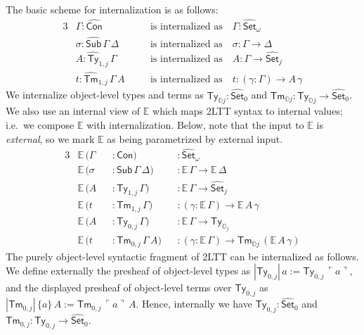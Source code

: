\documentclass[acmsmall]{acmart}
\newcommand{\msf}[1]{\mathsf{#1}}
\newcommand{\mbb}[1]{\mathbb{#1}}
\newcommand{\wh}[1]{\widehat{#1}}
\newcommand{\mbbo}{\mbb{O}}
\newcommand{\Con}{\msf{Con}}
\newcommand{\Sub}{\msf{Sub}}
\newcommand{\Ty}{\msf{Ty}}
\newcommand{\Tm}{\msf{Tm}}
\newcommand{\hCon}{\wh{\msf{Con}}}
\newcommand{\hSub}{\wh{\msf{Sub}}}
\newcommand{\hTy}{\wh{\msf{Ty}}}
\newcommand{\hTm}{\wh{\msf{Tm}}}
\newcommand{\Set}{\mathsf{Set}}
\newcommand{\emb}[1]{\ulcorner#1\urcorner}
\newcommand{\ev}{\mbb{E}}
\theoremstyle{remark}
\newcommand{\whset}{\wh{\Set}}
\begin{document}
\noindent The basic scheme for internalization is as follows:
\begin{alignat*}{3}
  & \Gamma : \hCon                  && \hspace{1em}\text{is internalized as}\hspace{1em} \Gamma : \whset_\omega\\
  & \sigma : \hSub\,\Gamma\,\Delta  && \hspace{1em}\text{is internalized as}\hspace{1em} \sigma : \Gamma \to \Delta\\
  & A : \hTy_{1,j}\,\Gamma           && \hspace{1em}\text{is internalized as}\hspace{1em} A      : \Gamma \to \whset_j \\
  & t : \hTm_{1,j}\,\Gamma\,A        && \hspace{1em}\text{is internalized as}\hspace{1em} t      : (\gamma : \Gamma) \to A\,\gamma
\end{alignat*}
We internalize object-level types and terms as $\Ty_{\mbbo j} : \whset_0$ and
$\Tm_{\mbbo j} : \Ty_{\mbbo j} \to \whset_0$.  We also use an internal view of
$\ev$ which maps 2LTT syntax to internal values; i.e.\ we compose $\ev$ with
internalization. Below, note that the input to $\ev$ is \emph{external}, so we
mark $\ev$ as being parametrized by external input.
\begin{alignat*}{3}
  &\ev\,(\Gamma &&: \Con)                      &&: \whset_\omega \\
  &\ev\,(\sigma &&: \Sub\,\Gamma\,\Delta)      &&: \ev\,\Gamma \to \ev\,\Delta \\
  &\ev\,(A      &&: \Ty_{1,j}\,\Gamma)          &&: \ev\,\Gamma \to \whset_j\\
  &\ev\,(t      &&: \Tm_{1,j}\,\Gamma)          &&: (\gamma : \ev\,\Gamma) \to \ev\,A\,\gamma\\
  &\ev\,(A      &&: \Ty_{0,j}\,\Gamma)          &&: \ev\,\Gamma \to \Ty_{\mbbo_j}\\
  &\ev\,(t      &&: \Tm_{0,j}\,\Gamma\,A)       &&: (\gamma : \ev\,\Gamma) \to \Tm_{\mbbo j}\,(\ev\,A\,\gamma)
\end{alignat*}
The purely object-level syntactic fragment of 2LTT can be internalized as
follows. We define externally the presheaf of object-level types as
$|\Ty_{0,j}|\,a := \Ty_{0,j}\,\emb{a}$, and the displayed presheaf of
object-level terms over $\Ty_{0,j}$ as $|\Tm_{0,j}|\,\{a\}\,A :=
  \Tm_{0,j}\,\emb{a}\,A$. Hence, internally we have $\Ty_{0,j} : \whset_0$ and
  $\Tm_{0,j} : \Ty_{0,j} \to \whset_0$.
\end{document}
